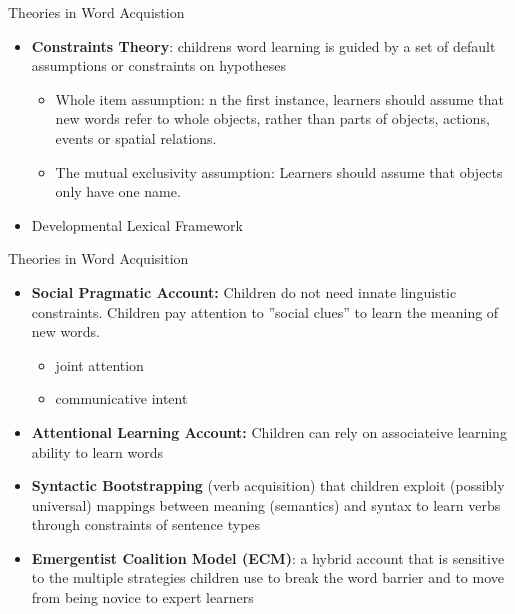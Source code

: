 \documentclass{beamer}
\begin{document}
\begin{frame}{Theories in Word Acquistion}
\begin{itemize}
    \item \textbf{Constraints Theory}:
    \pause
    childrens word learning is guided by a set of default assumptions or constraints on hypotheses 
    \pause
    \begin{itemize}
        \item Whole item assumption: 
        \pause 
        n the first instance, learners should assume that new words refer to whole objects, rather than parts of objects, actions, events or spatial relations.
        \pause
        \item The mutual exclusivity assumption:
        \pause
        Learners should assume that objects only have one name.
    \end{itemize}
    \item Developmental Lexical Framework
\end{itemize}
\end{frame}
\begin{frame}{Theories in Word Acquisition}
\begin{itemize}
    \item \textbf{Social Pragmatic Account:}
    \pause
    Children do not need innate linguistic constraints. Children pay attention to ”social clues” to learn the meaning of new words.
    \begin{itemize}
        \item joint attention
        \item communicative intent
    \end{itemize}
    \item \textbf{Attentional Learning Account:}
    \pause
    Children can rely on associateive learning ability to learn words
    \item \textbf{Syntactic Bootstrapping} (verb acquisition)
    \pause
    that children exploit (possibly universal) mappings between meaning (semantics) and syntax to learn verbs through constraints of sentence types
    \item \textbf{Emergentist Coalition Model (ECM)}:
    \pause a hybrid account that is sensitive to the multiple strategies children use to break the word barrier and to move from being novice to expert learners
\end{itemize}
    
\end{frame}
\end{document}
